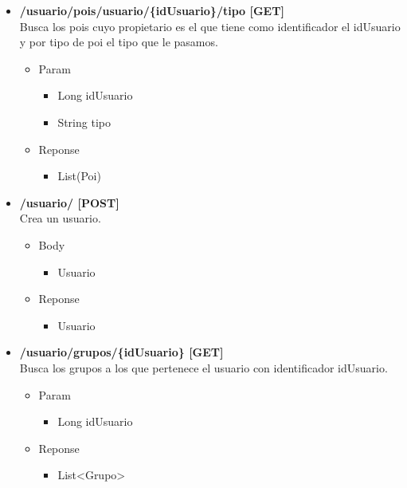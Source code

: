 \begin{itemize}
 \begin{itemize}
\item  \textbf{/usuario/pois/usuario/\{idUsuario\}/tipo [GET]}\\
Busca los pois cuyo propietario es el que tiene como identificador el idUsuario y por tipo de poi el tipo que le pasamos.
\begin{itemize}
\item Param
\begin{itemize}
\item Long idUsuario
\item String tipo
\end{itemize}
\item Reponse
\begin{itemize}
\item List(Poi)
\end{itemize}
\end{itemize}
\end{itemize}

\begin{itemize}
\item  \textbf{/usuario/ [POST]}\\
Crea un usuario.
\begin{itemize}

\item Body
\begin{itemize}
\item Usuario
\end{itemize}
\item Reponse
\begin{itemize}
\item Usuario
\end{itemize}
\end{itemize}
\end{itemize}

\begin{itemize}
\item  \textbf{/usuario/grupos/\{idUsuario\} [GET]}\\
Busca los grupos a los que pertenece el usuario con identificador idUsuario.
\begin{itemize}
\item Param
\begin{itemize}
\item Long idUsuario
\end{itemize}
\item Reponse
\begin{itemize}
\item List<Grupo>
\end{itemize}
\end{itemize}
\end{itemize}
 



\end{itemize}
